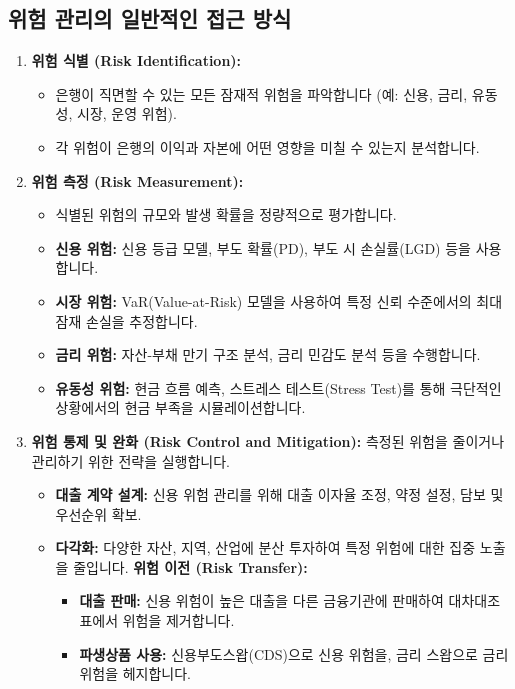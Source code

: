 \documentclass[11pt,a4paper]{article}
\theoremstyle{definition}
\begin{document}
\subsection{위험 관리의 일반적인 접근 방식}
\begin{enumerate}
    \item \textbf{위험 식별 (Risk Identification):}
        \begin{itemize}
            \item 은행이 직면할 수 있는 모든 잠재적 위험을 파악합니다 (예: 신용, 금리, 유동성, 시장, 운영 위험).
            \item 각 위험이 은행의 이익과 자본에 어떤 영향을 미칠 수 있는지 분석합니다.
        \end{itemize}
    \item \textbf{위험 측정 (Risk Measurement):}
        \begin{itemize}
            \item 식별된 위험의 규모와 발생 확률을 정량적으로 평가합니다.
            \item \textbf{신용 위험:} 신용 등급 모델, 부도 확률(PD), 부도 시 손실률(LGD) 등을 사용합니다.
            \item \textbf{시장 위험:} VaR(Value-at-Risk) 모델을 사용하여 특정 신뢰 수준에서의 최대 잠재 손실을 추정합니다.
            \item \textbf{금리 위험:} 자산-부채 만기 구조 분석, 금리 민감도 분석 등을 수행합니다.
            \item \textbf{유동성 위험:} 현금 흐름 예측, 스트레스 테스트(Stress Test)를 통해 극단적인 상황에서의 현금 부족을 시뮬레이션합니다.
        \end{itemize}
    \item \textbf{위험 통제 및 완화 (Risk Control and Mitigation):}
        측정된 위험을 줄이거나 관리하기 위한 전략을 실행합니다.
        \begin{itemize}
            \item \textbf{대출 계약 설계:} 신용 위험 관리를 위해 대출 이자율 조정, 약정 설정, 담보 및 우선순위 확보.
            \item \textbf{다각화:} 다양한 자산, 지역, 산업에 분산 투자하여 특정 위험에 대한 집중 노출을 줄입니다.
            \textbf{위험 이전 (Risk Transfer):}
                \begin{itemize}
                    \item \textbf{대출 판매:} 신용 위험이 높은 대출을 다른 금융기관에 판매하여 대차대조표에서 위험을 제거합니다.
                    \item \textbf{파생상품 사용:} 신용부도스왑(CDS)으로 신용 위험을, 금리 스왑으로 금리 위험을 헤지합니다.

\end{itemize}
\end{itemize}
\end{enumerate}
\end{document}
